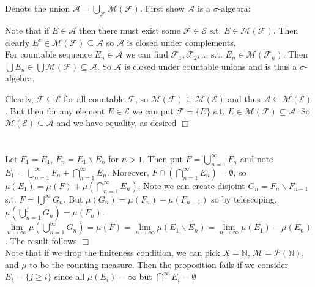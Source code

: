 \documentclass{article}
\newenvironment{myindentpar}[1]
  {\begin{list}{}
          {\setlength{\leftmargin}{#1}}
          \item[]
  }
  {\end{list}}
\begin{document}
\section{}
Denote the union $\mathcal{A} = \bigcup\limits_{\mathcal{F}} \mathcal{M}(\mathcal{F})$. First show $\mathcal{A}$ is a $\sigma$-algebra:\\
\begin{myindentpar}{2em}
    Note that if $E \in \mathcal{A}$ then there must exist some $\mathcal{F} \in \mathcal{E}$ s.t. $E \in \mathcal{M}(\mathcal{F})$. Then clearly $E^c \in \mathcal{M}(\mathcal{F}) \subseteq \mathcal{A}$ so $\mathcal{A}$ is closed under complements.\\
    For countable sequence $E_n \in \mathcal{A}$ we can find $\mathcal{F}_1, \mathcal{F}_2, \dots$ s.t. $E_n \in \mathcal{M}(\mathcal{F}_n)$. Then $\bigcup E_n \in \bigcup \mathcal{M}(\mathcal{F}) \subseteq \mathcal{A}$. So $\mathcal{A}$ is closed under countable unions and is thus a $\sigma$-algebra.
\end{myindentpar}
Clearly, $\mathcal{F} \subseteq \mathcal{E}$ for all countable $\mathcal{F}$, so $\mathcal{M}(\mathcal{F}) \subseteq \mathcal{M}(\mathcal{E})$ and thus $\mathcal{A} \subseteq \mathcal{M}(\mathcal{E})$. But then for any element $E \in \mathcal{E}$ we can put $\mathcal{F} = \{E\}$ s.t. $E \in \mathcal{M}(\mathcal{F}) \subseteq \mathcal{A}$. So $\mathcal{M}(\mathcal{E}) \subseteq \mathcal{A}$ and we have equality, as desired $\Box$

\section{}
Let $F_1 = E_1$, $F_n = E_1 \backslash E_n$ for $n>1$. Then put $F = \bigcup\limits_{n=1}^\infty F_n$ and note $E_1 = \bigcup\limits_{n=1}^\infty F_n + \bigcap\limits_{n=1}^\infty E_n$. Moreover, $F \cap \left(\bigcap\limits_{n = 1}^\infty E_n \right) = \emptyset$, so $\mu (E_1) = \mu (F) + \mu (\bigcap\limits_{n=1}^\infty E_n)$. Note we can create disjoint $G_n = F_n \backslash F_{n-1}$ s.t. $F = \bigcup\limits^\infty G_n$. But $\mu (G_n) = \mu (F_n) - \mu (F_{n-1})$ so by telescoping, $\mu (\bigcup\limits_{n = 1}^j G_n)= \mu (F_n)$. $\lim\limits_{n\rightarrow\infty} \mu (\bigcup\limits_{n = 1}^\infty G_n) = \mu (F) = \lim\limits_{n\rightarrow\infty} \mu (E_1 \backslash E_n) = \lim\limits_{n\rightarrow\infty} \mu (E_1) - \mu (E_n)$. The result follows $\Box$\\
Note that if we drop the finiteness condition, we can pick $X = \mathbb{N}$, $\mathcal{M} = \mathcal{P}(\mathbb{N})$, and $\mu$ to be the counting measure. Then the proposition fails if we consider $E_i = \{j \geq i\}$ since all $\mu (E_i) = \infty$ but $\bigcap\limits^\infty E_i = \emptyset$
\end{document}
